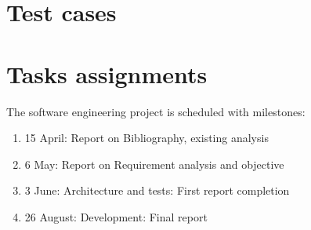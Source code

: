 \documentclass[11pt]{article}
\begin{document}
\section{Test cases}
\par{}
\section{Tasks assignments}
The software engineering project is scheduled with milestones:
\begin{enumerate}
\item 15 April: Report on Bibliography, existing analysis
\item 6 May: Report on Requirement analysis and objective
\item 3 June: Architecture and tests: First report completion
\item 26 August: Development: Final report
\end{enumerate}
\end{document}
